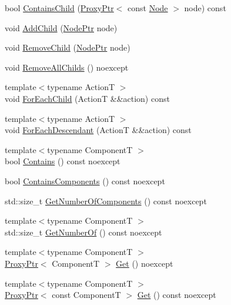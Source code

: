 \begin{DoxyCompactItemize}
bool \mbox{\hyperlink{classmage_1_1_node_a2c1d85609b765c019a0a123f5f8a182a}{Contains\+Child}} (\mbox{\hyperlink{classmage_1_1_proxy_ptr}{Proxy\+Ptr}}$<$ const \mbox{\hyperlink{classmage_1_1_node}{Node}} $>$ node) const
\item 
void \mbox{\hyperlink{classmage_1_1_node_ad2324a1a111548e4b80b8e4cbaba5221}{Add\+Child}} (\mbox{\hyperlink{classmage_1_1_node_ac575dc006e0ae1134277ade977dc06b6}{Node\+Ptr}} node)
\item 
void \mbox{\hyperlink{classmage_1_1_node_a0654443d58730ebc7471626a38c2bc7f}{Remove\+Child}} (\mbox{\hyperlink{classmage_1_1_node_ac575dc006e0ae1134277ade977dc06b6}{Node\+Ptr}} node)
\item 
void \mbox{\hyperlink{classmage_1_1_node_a601804f7da1df59d5f0bd91a68dc7282}{Remove\+All\+Childs}} () noexcept
\item 
{\footnotesize template$<$typename ActionT $>$ }\\void \mbox{\hyperlink{classmage_1_1_node_a3e3e68660b1626caf160723f17113669}{For\+Each\+Child}} (ActionT \&\&action) const
\item 
{\footnotesize template$<$typename ActionT $>$ }\\void \mbox{\hyperlink{classmage_1_1_node_ad327e0c58c9d72026b233b0df4f82929}{For\+Each\+Descendant}} (ActionT \&\&action) const
\item 
{\footnotesize template$<$typename ComponentT $>$ }\\bool \mbox{\hyperlink{classmage_1_1_node_ab3defd7329e8f87cff65cd8136c8f2d2}{Contains}} () const noexcept
\item 
bool \mbox{\hyperlink{classmage_1_1_node_aafb492896751b5b60ba5ddaeecbdd719}{Contains\+Components}} () const noexcept
\item 
std\+::size\+\_\+t \mbox{\hyperlink{classmage_1_1_node_a2ec7670be118f19aced512a528e6e7cb}{Get\+Number\+Of\+Components}} () const noexcept
\item 
{\footnotesize template$<$typename ComponentT $>$ }\\std\+::size\+\_\+t \mbox{\hyperlink{classmage_1_1_node_a50932c5cc58d9cbf18380bebdcaa7717}{Get\+Number\+Of}} () const noexcept
\item 
{\footnotesize template$<$typename ComponentT $>$ }\\\mbox{\hyperlink{classmage_1_1_proxy_ptr}{Proxy\+Ptr}}$<$ ComponentT $>$ \mbox{\hyperlink{classmage_1_1_node_af514b0282820f1d071fc24a2b815ae82}{Get}} () noexcept
\item 
{\footnotesize template$<$typename ComponentT $>$ }\\\mbox{\hyperlink{classmage_1_1_proxy_ptr}{Proxy\+Ptr}}$<$ const ComponentT $>$ \mbox{\hyperlink{classmage_1_1_node_a597f86bd9faecda719c37c4b2c73231e}{Get}} () const noexcept

\end{DoxyCompactItemize}

